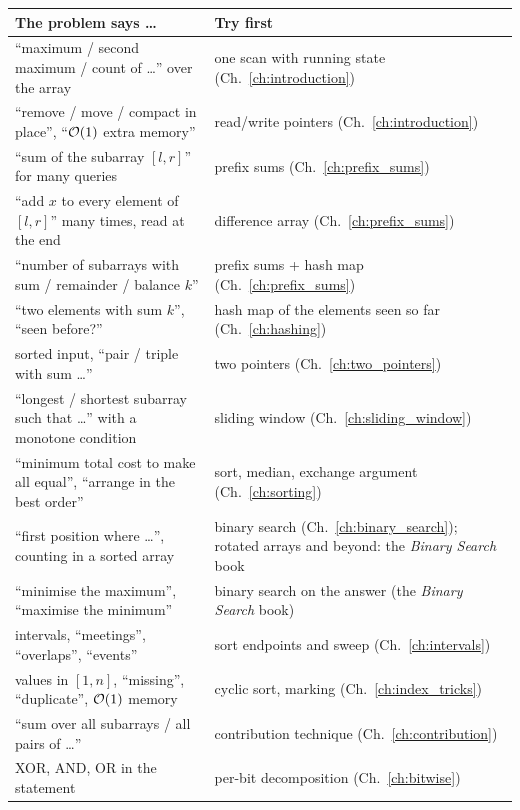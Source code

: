 \begingroup\small\renewcommand{\arraystretch}{1.3}
\begin{tabularx}{\linewidth}{@{}>{\raggedright\arraybackslash}p{6.2cm} X@{}}
\toprule
\textbf{The problem says \ldots} & \textbf{Try first} \\
\midrule
``maximum / second maximum / count of \ldots'' over the array & one scan with running state (Ch.~\ref{ch:introduction}) \\
``remove / move / compact in place'', ``$\mathcal{O}(1)$ extra memory'' & read/write pointers (Ch.~\ref{ch:introduction}) \\
``sum of the subarray $[l, r]$'' for many queries & prefix sums (Ch.~\ref{ch:prefix_sums}) \\
``add $x$ to every element of $[l, r]$'' many times, read at the end & difference array (Ch.~\ref{ch:prefix_sums}) \\
``number of subarrays with sum / remainder / balance $k$'' & prefix sums + hash map (Ch.~\ref{ch:prefix_sums}) \\
``two elements with sum $k$'', ``seen before?'' & hash map of the elements seen so far (Ch.~\ref{ch:hashing}) \\
sorted input, ``pair / triple with sum \ldots'' & two pointers (Ch.~\ref{ch:two_pointers}) \\
``longest / shortest subarray such that \ldots'' with a monotone condition & sliding window (Ch.~\ref{ch:sliding_window}) \\
``minimum total cost to make all equal'', ``arrange in the best order'' & sort, median, exchange argument (Ch.~\ref{ch:sorting}) \\
``first position where \ldots'', counting in a sorted array & binary search (Ch.~\ref{ch:binary_search}); rotated arrays and beyond: the \textit{Binary Search} book \\
``minimise the maximum'', ``maximise the minimum'' & binary search on the answer (the \textit{Binary Search} book) \\
intervals, ``meetings'', ``overlaps'', ``events'' & sort endpoints and sweep (Ch.~\ref{ch:intervals}) \\
values in $[1, n]$, ``missing'', ``duplicate'', $\mathcal{O}(1)$ memory & cyclic sort, marking (Ch.~\ref{ch:index_tricks}) \\
``sum over all subarrays / all pairs of \ldots'' & contribution technique (Ch.~\ref{ch:contribution}) \\
XOR, AND, OR in the statement & per-bit decomposition (Ch.~\ref{ch:bitwise}) \\

\end{tabularx}
